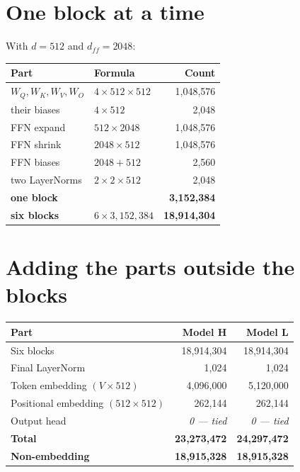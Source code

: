 \documentclass[11pt]{report}
\begin{document}
\section{One block at a time}

With $d = 512$ and $d_{ff} = 2048$:

\begin{center}
\begin{tabular}{llr}
\toprule
Part & Formula & Count \\
\midrule
$W_Q, W_K, W_V, W_O$ & $4 \times 512 \times 512$ & 1,048,576 \\
their biases & $4 \times 512$ & 2,048 \\
FFN expand & $512 \times 2048$ & 1,048,576 \\
FFN shrink & $2048 \times 512$ & 1,048,576 \\
FFN biases & $2048 + 512$ & 2,560 \\
two LayerNorms & $2 \times 2 \times 512$ & 2,048 \\
\midrule
\textbf{one block} & & \textbf{3,152,384} \\
\textbf{six blocks} & $6 \times 3{,}152{,}384$ & \textbf{18,914,304} \\
\bottomrule
\end{tabular}
\end{center}

\section{Adding the parts outside the blocks}

\begin{center}
\begin{tabular}{lrr}
\toprule
Part & Model H & Model L \\
\midrule
Six blocks & 18,914,304 & 18,914,304 \\
Final LayerNorm & 1,024 & 1,024 \\
Token embedding $(V \times 512)$ & 4,096,000 & 5,120,000 \\
Positional embedding $(512 \times 512)$ & 262,144 & 262,144 \\
Output head & \textit{0 --- tied} & \textit{0 --- tied} \\
\midrule
\textbf{Total} & \textbf{23,273,472} & \textbf{24,297,472} \\
\textbf{Non-embedding} & \textbf{18,915,328} & \textbf{18,915,328} \\
\bottomrule
\end{tabular}
\end{center}
\end{document}
